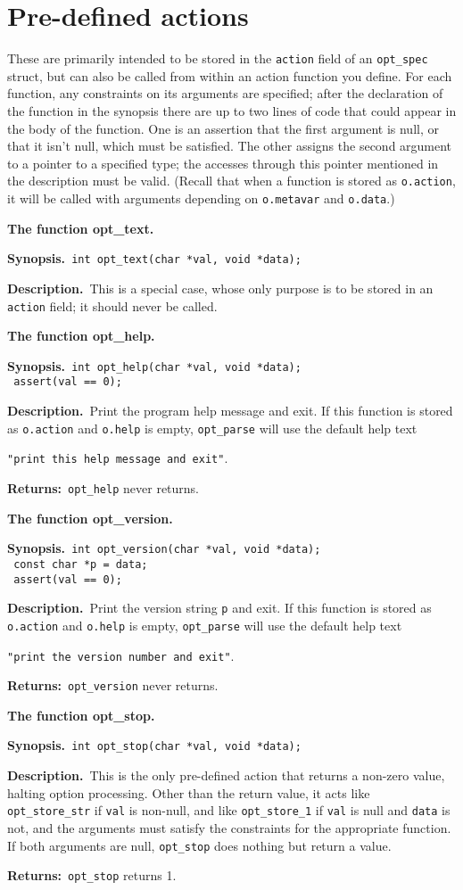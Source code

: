\documentclass{article}
\newenvironment{chunk}[1]
{\par\smallskip\noindent\textbf{#1.}\par\nopagebreak}
{\par\smallskip}
\renewcommand{\tt}{\texttt}
\newcommand{\synopsis}{\par\noindent\textbf{Synopsis.}}
\newcommand{\synocont}{\\\phantom{\textbf{Synopsis.}}}
\newcommand{\descr}{\par\noindent\textbf{Description.}\ }
\newcommand{\return}{\par\noindent\textbf{Returns:}\ }
\begin{document}
\section{Pre-defined actions}\label{sect:predef}
These are primarily intended to be stored in the \tt{action} field
of an \tt{opt\_spec} struct, but can also be called from within an
action function you define. For each function, any constraints on its
arguments are specified; after the declaration of the function in the
synopsis there are up to two lines of code that could appear in the
body of the function. One is an assertion that the first argument is
null, or that it isn't null, which must be satisfied. The other
assigns the second argument to a pointer to a specified type; the
accesses through this pointer mentioned in the description must be
valid. (Recall that when a function is stored as \tt{o.action}, it
will be called with arguments depending on \tt{o.metavar} and
\tt{o.data}.) 
\begin{chunk}{The function opt\_text}
  \synopsis\verb+ int opt_text(char *val, void *data);+
  \descr This is a special case, whose only purpose is to be stored in
  an \tt{action} field; it should never be called.
\end{chunk}
\begin{chunk}{The function opt\_help}
  \synopsis\verb+ int opt_help(char *val, void *data);+
  \synocont\verb+ assert(val == 0);+
  \descr Print the program help message and exit. If this function is
  stored as \tt{o.action} and \tt{o.help} is empty, \tt{opt\_parse}
  will use the default help text

  \tt{"print this help message and exit"}. 
  \return \tt{opt\_help} never returns.
\end{chunk}
\begin{chunk}{The function opt\_version}
  \synopsis\verb+ int opt_version(char *val, void *data);+
  \synocont\verb+ const char *p = data;+
  \synocont\verb+ assert(val == 0);+
  \descr Print the version string \tt{p} and exit. If this function is
  stored as \tt{o.action} and \tt{o.help} is empty, \tt{opt\_parse}
  will use the default help text

  \tt{"print the version number and exit"}. 
  \return \tt{opt\_version} never returns.
\end{chunk}
\begin{chunk}{The function opt\_stop}
  \synopsis\verb+ int opt_stop(char *val, void *data);+
  \descr This is the only pre-defined action that returns a non-zero
  value, halting option processing. Other than the return value, it
  acts like \tt{opt\_store\_str} if \tt{val} is non-null, and like
  \tt{opt\_store\_1} if \tt{val} is null and \tt{data} is not, and
  the arguments must satisfy the constraints for the appropriate
  function. If both arguments are null, \tt{opt\_stop} does nothing but
  return a value.
  \return \tt{opt\_stop} returns 1.
\end{chunk}
\end{document}
